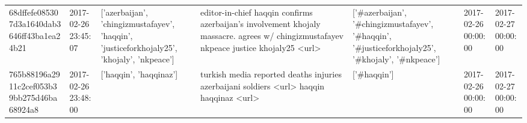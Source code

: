\begin{tabular}{lllllll}
68dffefe085307d3a1640dab3646ff43ba1ea24b21 & 2017-02-26 23:45:07 & ['azerbaijan', 'chingizmustafayev', 'haqqin', 'justiceforkhojaly25', 'khojaly', 'nkpeace'] & editor-in-chief haqqin confirms azerbaijan's involvement khojaly massacre. agrees w/ chingizmustafayev nkpeace justice khojaly25 <url> & ['#azerbaijan', '#chingizmustafayev', '#haqqin', '#justiceforkhojaly25', '#khojaly', '#nkpeace'] & 2017-02-26 00:00:00 & 2017-02-27 00:00:00 \\
765b88196a2911c2cef053b39bb275d46ba68924a8 & 2017-02-26 23:48:00 & ['haqqin', 'haqqinaz'] & turkish media reported deaths injuries azerbaijani soldiers <url> haqqin haqqinaz <url> & ['#haqqin'] & 2017-02-26 00:00:00 & 2017-02-27 00:00:00 \\
\bottomrule
\end{tabular}
